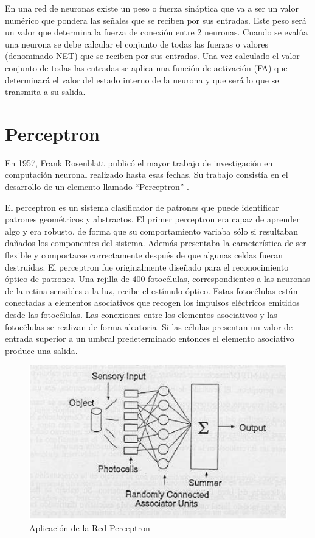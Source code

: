 En una red de neuronas existe un peso o fuerza sináptica que va a ser un valor numérico que pondera las señales que se reciben por sus entradas. Este peso será un valor que determina la fuerza de conexión entre 2 neuronas. Cuando se evalúa una neurona se debe calcular el conjunto de todas las fuerzas o valores (denominado NET) que se reciben por sus entradas. Una vez calculado el valor conjunto de todas las entradas se aplica una función de activación (FA) que determinará el valor del estado interno de la neurona y que será lo que se transmita a su salida\cite{pose2009introduccion}.

\section{Perceptron}
En 1957, Frank Rosenblatt publicó el mayor trabajo de investigación en computación neuronal realizado hasta esas fechas. Su trabajo consistía en el desarrollo de un
elemento llamado “Perceptron” \cite{olabe1998redes}.

\vspace{1\baselineskip}
El perceptron es un sistema clasificador de patrones que puede identificar patrones geométricos y abstractos. El primer perceptron era capaz de aprender algo y era robusto, de forma que su comportamiento variaba sólo si resultaban dañados los componentes del sistema. 
Además presentaba la característica de ser flexible y comportarse correctamente después de que algunas celdas fueran destruidas.
El perceptron fue originalmente diseñado para el reconocimiento óptico de patrones.
Una rejilla de 400 fotocélulas, correspondientes a las neuronas de la retina sensibles a la luz, recibe el estímulo óptico. Estas fotocélulas están conectadas a elementos asociativos que recogen los impulsos eléctricos emitidos desde las fotocélulas. Las
conexiones entre los elementos asociativos y las fotocélulas se realizan de forma aleatoria.
Si las células presentan un valor de entrada superior a un umbral predeterminado entonces el elemento asociativo produce una salida\cite{olabe1998redes}.

\begin{figure}[H]
  \begin{center}
    \includegraphics[scale=0.90]{./perceptron.png}
    \caption{Aplicación de la Red Perceptron}
    \label{fig:perceptron}
  \end{center}
\end{figure}

